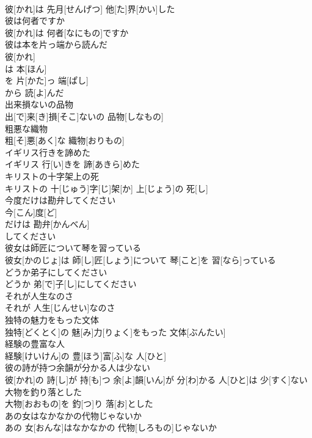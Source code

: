 \documentclass[8pt]{extreport}
\begin{document}
\begin{CJK}{UTF8}{min}
\\	彼[かれ]は 先月[せんげつ] 他[た]界[かい]した
\\	彼は何者ですか	
\\	彼[かれ]は 何者[なにもの]ですか
\\	彼は本を片っ端から読んだ	
\\	彼[かれ]
\\	は 本[ほん]
\\	を 片[かた]っ 端[ぱし]
\\	から 読[よ]んだ 
\\	出来損ないの品物	
\\	出[で]来[き]損[そこ]ないの 品物[しなもの]
\\	粗悪な織物	
\\	粗[そ]悪[あく]な 織物[おりもの]
\\	イギリス行きを諦めた	
\\	イギリス 行[い]きを 諦[あきら]めた
\\	キリストの十字架上の死	
\\	キリストの 十[じゅう]字[じ]架[か] 上[じょう]の 死[し]
\\	今度だけは勘弁してください	
\\	今[こん]度[ど]
\\	だけは 勘弁[かんべん]
\\	してください 
\\	彼女は師匠について琴を習っている	
\\	彼女[かのじょ]は 師[し]匠[しょう]について 琴[こと]を 習[なら]っている
\\	どうか弟子にしてください	
\\	どうか 弟[で]子[し]にしてください
\\	それが人生なのさ	
\\	それが 人生[じんせい]なのさ
\\	独特の魅力をもった文体	
\\	独特[どくとく]の 魅[み]力[りょく]をもった 文体[ぶんたい]
\\	経験の豊富な人	
\\	経験[けいけん]の 豊[ほう]富[ふ]な 人[ひと]
\\	彼の詩が持つ余韻が分かる人は少ない	
\\	彼[かれ]の 詩[し]が 持[も]つ 余[よ]韻[いん]が 分[わ]かる 人[ひと]は 少[すく]ない
\\	大物を釣り落とした	
\\	大物[おおもの]を 釣[つ]り 落[お]とした
\\	あの女はなかなかの代物じゃないか	
\\	あの 女[おんな]はなかなかの 代物[しろもの]じゃないか

\end{CJK}
\end{document}
